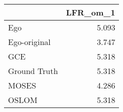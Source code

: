 \begin{tabular}{lr}
\toprule
{} & LFR_om_1 \\
\midrule
Ego          &    5.093 \\
Ego-original &    3.747 \\
GCE          &    5.318 \\
Ground Truth &    5.318 \\
MOSES        &    4.286 \\
OSLOM        &    5.318 \\
\bottomrule
\end{tabular}
